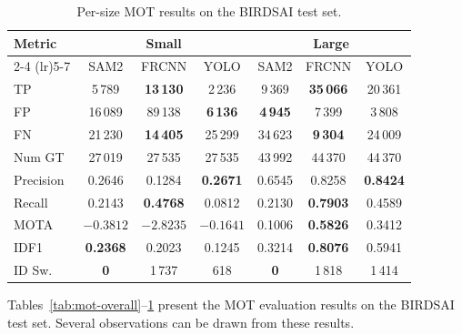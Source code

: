 \documentclass[
]{article}
\begin{document}
\begin{table}[htbp]
\centering
\begin{tabular}{l ccc ccc}
\toprule
\textbf{Metric} & \multicolumn{3}{c}{\textbf{Small}} & \multicolumn{3}{c}{\textbf{Large}} \\
\cmidrule(lr){2-4} \cmidrule(lr){5-7}
 & SAM2 & FRCNN & YOLO & SAM2 & FRCNN & YOLO \\
\midrule
TP        & 5\,789           & \textbf{13\,130} & 2\,236           & 9\,369           & \textbf{35\,066} & 20\,361 \\
FP        & 16\,089          & 89\,138          & \textbf{6\,136}  & \textbf{4\,945}  & 7\,399           & 3\,808  \\
FN        & 21\,230          & \textbf{14\,405} & 25\,299          & 34\,623          & \textbf{9\,304}  & 24\,009 \\
Num GT    & 27\,019          & 27\,535          & 27\,535          & 43\,992          & 44\,370          & 44\,370 \\
Precision & 0.2646           & 0.1284           & \textbf{0.2671}  & 0.6545           & 0.8258           & \textbf{0.8424} \\
Recall    & 0.2143           & \textbf{0.4768}  & 0.0812           & 0.2130           & \textbf{0.7903}  & 0.4589  \\
MOTA      & $-0.3812$        & $-2.8235$        & \textbf{$-0.1641$} & 0.1006         & \textbf{0.5826}  & 0.3412  \\
IDF1      & \textbf{0.2368}  & 0.2023           & 0.1245           & 0.3214           & \textbf{0.8076}  & 0.5941  \\
ID Sw.    & \textbf{0}       & 1\,737           & 618              & \textbf{0}       & 1\,818           & 1\,414  \\
\bottomrule
\end{tabular}
\caption{Per-size MOT results on the BIRDSAI test set.}
\label{tab:mot-per-size}
\end{table}

Tables~\ref{tab:mot-overall}--\ref{tab:mot-per-size} present the MOT evaluation results on the BIRDSAI test set. Several observations can be drawn from these results.
\end{document}
